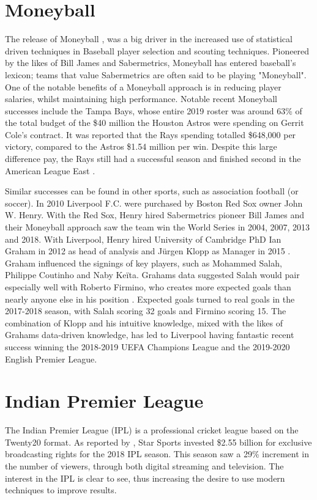 \documentclass[12pt,a4paper]{report}
\begin{document}
\section{Moneyball}

The release of Moneyball \citep{Moneyball2004}, was a big driver in the increased use of statistical driven techniques in Baseball player selection and scouting techniques. 
Pioneered by the likes of Bill James and Sabermetrics, Moneyball has entered baseball's lexicon; teams that value Sabermetrics are often said to be playing "Moneyball".  
One of the notable benefits of a Moneyball approach is in reducing player salaries, whilst maintaining high performance. 
Notable recent Moneyball successes include the Tampa Bays, whose entire 2019 roster was around 63\% of the total budget of the \$40 million the Houston Astros were spending on Gerrit Cole's contract. 
It was reported that the Rays spending totalled \$648,000 per victory, compared to the Astros \$1.54 million per win.
Despite this large difference pay, the Rays still had a successful season and finished second in the American League East \citep{Fox2019}.

Similar successes can be found in other sports, such as association football (or soccer). 
In 2010 Liverpool F.C. were purchased by Boston Red Sox owner John W. Henry. 
With the Red Sox, Henry hired Sabermetrics pioneer Bill James and their Moneyball approach saw the team win the World Series in 2004, 2007, 2013 and 2018. 
With Liverpool, Henry hired University of Cambridge PhD Ian Graham in 2012 as head of analysis and J\"urgen Klopp as Manager in 2015 \citep{Liverpool2022}. 
Graham influenced the signings of key players, such as Mohammed Salah, Philippe Coutinho and Naby Ke\"ita. 
Grahams data suggested Salah would pair especially well with Roberto Firmino, who creates more expected goals than nearly anyone else in his position \citep{Liverpool2019}. 
Expected goals turned to real goals in the 2017-2018 season, with Salah scoring 32 goals and Firmino scoring 15. 
The combination of Klopp and his intuitive knowledge, mixed with the likes of Grahams data-driven knowledge, has led to Liverpool having fantastic recent success winning the 2018-2019 UEFA Champions League and the 2019-2020 English Premier League.

\section{Indian Premier League}

The Indian Premier League (IPL) is a professional cricket league based on the Twenty20 format. 
As reported by \citet{ESPNcricinfo2018}, Star Sports invested \$2.55 billion for exclusive broadcasting rights for the 2018 IPL season. 
This season saw a 29\% increment in the number of viewers, through both digital streaming and television. 
The interest in the IPL is clear to see, thus increasing the desire to use modern techniques to improve results.
\end{document}
